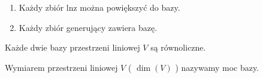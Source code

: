 \begin{wn} \hfill
    \begin{enumerate}[{(}1{)}]
        \item Każdy zbiór lnz można powiększyć do bazy.
        \item Każdy zbiór generujący zawiera bazę.
    \end{enumerate}
\end{wn}

\begin{tw}
    Każde dwie bazy przestrzeni liniowej $ V $ są równoliczne.
\end{tw}

\begin{df}
    Wymiarem przestrzeni liniowej $ V $ ( $ \dim(V) $ ) nazywamy moc bazy.
\end{df}


